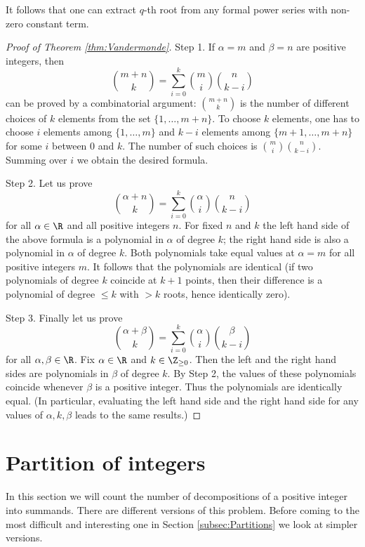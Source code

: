 \begin{page}
\setcounter{section}{3}
\setcounter{subsection}{0}
\setcounter{dfn}{17}
\label{portion:875}


It follows that one can extract $q$-th root from any formal power series with non-zero constant term.

\begin{proof}[Proof of Theorem \ref{thm:Vandermonde}]
Step 1. If $\alpha = m$ and $\beta = n$ are positive integers, then
\[
\binom{m + n}{k} = \sum_{i=0}^k \binom{m}{i} \binom{n}{k-i}
\]
can be proved by a combinatorial argument: $\binom{m+n}{k}$ is the number of different choices of $k$ elements from the set $\{1, \ldots, m+n\}$.
To choose $k$ elements, one has to choose $i$ elements among $\{1, \ldots, m\}$ and $k-i$ elements among $\{m+1, \ldots, m+n\}$ for some $i$ between $0$ and $k$.
The number of such choices is $\binom{m}{i} \binom{n}{k-i}$.
Summing over $i$ we obtain the desired formula.

Step 2. Let us prove
\[
\binom{\alpha + n}{k} = \sum_{i=0}^k \binom{\alpha}{i} \binom{n}{k-i}
\]
for all $\alpha \in \R$ and all positive integers $n$.
For fixed $n$ and $k$ the left hand side of the above formula is a polynomial in $\alpha$ of degree $k$;
the right hand side is also a polynomial in $\alpha$ of degree $k$.
Both polynomials take equal values at $\alpha = m$ for all positive integers $m$.
It follows that the polynomials are identical
(if two polynomials of degree $k$ coincide at $k+1$ points, then their difference is a polynomial of degree $\le k$ with $> k$ roots, hence identically zero).

Step 3. Finally let us prove
\[
\binom{\alpha + \beta}{k} = \sum_{i=0}^k \binom{\alpha}{i} \binom{\beta}{k-i}
\]
for all $\alpha, \beta \in \R$.
Fix $\alpha \in \R$ and $k \in \Z_{\ge 0}$. Then the left and the right hand sides are polynomials in $\beta$ of degree $k$.
By Step 2, the values of these polynomials coincide whenever $\beta$ is a positive integer.
Thus the polynomials are identically equal.
(In particular, evaluating the left hand side and the right hand side for any values of $\alpha, k, \beta$ leads to the same results.)
\end{proof}






\end{page}

\begin{page}
\setcounter{section}{3}
\setcounter{subsection}{1}
\setcounter{dfn}{0}
\label{portion:877}

\section{Partition of integers}
In this section we will count the number of decompositions of a positive integer into summands.
There are different versions of this problem.
Before coming to the most difficult and interesting one in Section \ref{subsec:Partitions} we look at simpler versions.




\end{page}


